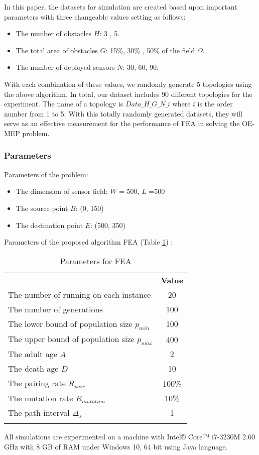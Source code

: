 \documentclass[final]{elsarticle}
\begin{document}
In this paper, the datasets for simulation are created based upon important parameters with three changeable values setting as follows:
\begin{itemize}
	\item The number of obstacles $H$: 3 , 5.
	\item The total area of obstacles $G$: 15\%, 30\% , 50\% of the field $\Omega$.
	\item The number of deployed sensors $N$: 30, 60, 90.
\end{itemize}
With each combination of these values, we randomly generate 5 topologies using the above algorithm. In total, our dataset includes 90 different topologies for the experiment. The name of a topology is $Data\_H\_G\_N\_i$ where $ i $ is the order number from 1 to 5. With this totally randomly generated datasets, they will serve as an effective measurement for the performance of FEA in solving the OE-MEP problem. 

\subsubsection{Parameters}
Parameters of the problem:
\begin{itemize}
	\item The dimension of sensor field: $ W $ = 500, $ L $ =500
	\item The source point $ B $: (0, 150) 
	\item The destination point $ E $: (500, 350)	
\end{itemize}
Parameters of the proposed algorithm FEA (Table \ref{tab1}) :
\begin{table}
	\caption{Parameters for FEA}
	\label{tab1}       %
	\begin{center}
		\renewcommand{\arraystretch}{1.5}
		\begin{tabular}{lc}
			\hline\noalign{\smallskip}
			\multicolumn{1}{c}{\textbf{Parameter}} & \textbf{Value} \\
			\noalign{\smallskip}\hline\noalign{\smallskip}
			The number of running on each instance & 20 \\
			The number of generations & 100\\
			The lower bound of population size $ p_{min} $ & 100\\
			The upper bound of population size $ p_{max} $ & 400\\
			The adult age $A$ & 2 \\
			The death age $D$ & 10 \\
			The pairing rate $ R_{pair}$  & 100\% \\
			The mutation rate $ R_{mutation} $ & 10\% \\
			The path interval $\Delta_s$ & 1 \\ 
			\noalign{\smallskip} \hline
		\end{tabular}
	\end{center}
\end{table}
All simulations are experimented on a machine with Intel® Core™ i7-3230M 2.60 GHz with 8 GB of RAM under Windows 10, 64 bit using Java language.
\end{document}
